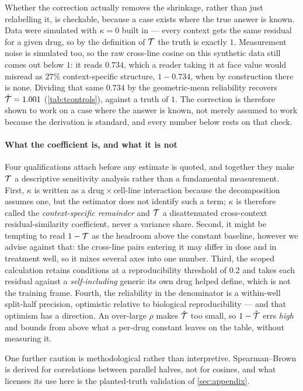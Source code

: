 Whether the correction actually removes the shrinkage, rather than just
relabelling it, is checkable, because a case exists where the true answer is
known. Data were simulated with $\kappa = 0$ built in --- every context gets the
same residual for a given drug, so by the definition of $\mathcal{T}$ the truth is
exactly $1$. Measurement noise is simulated too, so the raw cross-line cosine on
this synthetic data still comes out below $1$: it reads $0.734$, which a reader
taking it at face value would misread as $27\%$ context-specific structure,
$1 - 0.734$, when by construction there is none. Dividing that same $0.734$ by
the geometric-mean reliability recovers $\hat{\mathcal{T}} = 1.001$
(\cref{tab:tcontrols}), against a truth of $1$. The correction is therefore shown
to work on a case where the answer is known, not merely assumed to work because
the derivation is standard, and every number below rests on that check.

\paragraph{What the coefficient is, and what it is not} Four qualifications attach
before any estimate is quoted, and together they make $\mathcal{T}$ a descriptive
sensitivity analysis rather than a fundamental measurement. First, $\kappa$ is
written as a drug\,$\times$\,cell-line interaction because the decomposition
assumes one, but the estimator does not identify such a term; $\kappa$ is therefore
called the \emph{context-specific remainder} and $\mathcal{T}$ a disattenuated
cross-context residual-similarity coefficient, never a variance share. Second, it might be tempting to read $1 - \mathcal{T}$ as the headroom above the constant baseline, however we advise against that: the cross-line pairs
entering it may differ in dose and in treatment well, so it mixes several
axes into one number. Third, the scoped calculation retains conditions at a
reproducibility threshold of $0.2$ and takes each residual against a
\emph{self-including} generic its own drug helped define, which is not the training
frame. Fourth, the reliability in the denominator is a within-well split-half
precision, optimistic relative to biological reproducibility --- and that optimism
has a direction. An over-large $\rho$ makes $\hat{\mathcal{T}}$ too small, so
$1 - \hat{\mathcal{T}}$ errs \emph{high} and bounds from above what a per-drug constant
leaves on the table, without measuring it.

One further caution is methodological rather than interpretive. Spearman--Brown is
derived for correlations between parallel halves, not for cosines, and what
licenses its use here is the planted-truth validation of \cref{sec:appendix}.


